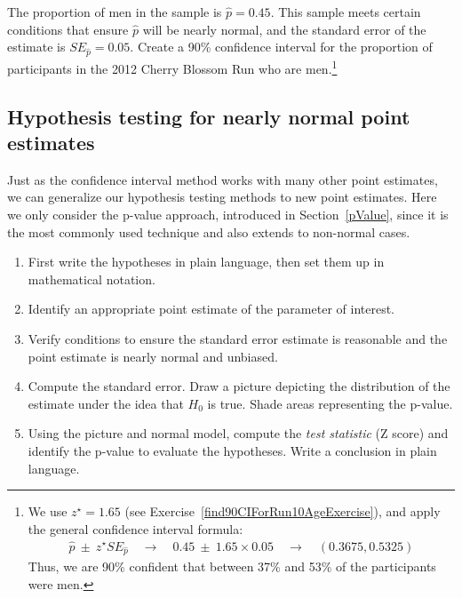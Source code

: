 \begin{exercise}
The proportion of men in the  sample is $\hat{p}=0.45$. This sample meets certain conditions that ensure $\hat{p}$ will be nearly normal, and the standard error of the estimate is $SE_{\hat{p}}=0.05$. Create a 90\% confidence interval for the proportion of participants in the 2012 Cherry Blossom Run who are men.\footnote{We use $z^{\star}=1.65$ (see Exercise~\vref{find90CIForRun10AgeExercise}), and apply the general confidence interval formula:
\begin{eqnarray*}
\hat{p}\ \pm\ z^{\star}SE_{\hat{p}}
	\quad\to\quad 0.45\ \pm\ 1.65\times 0.05
	\quad\to\quad (0.3675, 0.5325)
\end{eqnarray*}
Thus, we are 90\% confident that between 37\% and 53\% of the participants were men.}
\end{exercise}


\subsection{Hypothesis testing for nearly normal point estimates}

Just as the confidence interval method works with many other point estimates, we can generalize our hypothesis testing methods to new point estimates. Here we only consider the p-value approach, introduced in Section~\ref{pValue}, since it is the most commonly used technique and also extends to non-normal cases.

\begin{termBox}{
\begin{enumerate}
\setlength{\itemsep}{0mm}
\item First write the hypotheses in plain language, then set them up in mathematical notation.
\item Identify an appropriate point estimate of the parameter of interest.
\item Verify conditions to ensure the standard error estimate is reasonable and the point estimate is nearly normal and unbiased.
\item Compute the standard error. Draw a picture depicting the distribution of the estimate under the idea that $H_0$ is true. Shade areas representing the p-value.
\item Using the picture and normal model, compute the \emph{test statistic} (Z score) and identify the p-value to evaluate the hypotheses. Write a conclusion in plain language.
\end{enumerate}}
\end{termBox}


